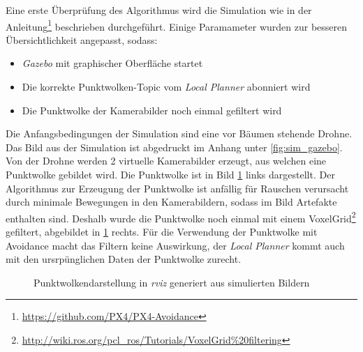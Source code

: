 Eine erste Überprüfung des Algorithmus wird die Simulation wie in der Anleitung\footnote{\url{https://github.com/PX4/PX4-Avoidance}\cite{dronecodestiftungObstacleDetectionAvoidance2023}} beschrieben durchgeführt. Einige Paramameter wurden zur besseren Übersichtlichkeit angepasst, sodass:
\begin{itemize}
    \item \textit{Gazebo} mit graphischer Oberfläche startet
    \item Die korrekte Punktwolken-Topic vom \textit{Local Planner} abonniert wird
    \item Die Punktwolke der Kamerabilder noch einmal gefiltert wird
\end{itemize} 

Die Anfangsbedingungen der Simulation sind eine vor Bäumen stehende Drohne. Das Bild aus der Simulation ist abgedruckt im Anhang unter \ref{fig:sim_gazebo}. Von der Drohne werden 2 virtuelle Kamerabilder erzeugt, aus welchen eine Punktwolke gebildet wird. Die Punktwolke ist in Bild \ref{fig:sim_gazebo_stereo} links dargestellt. Der Algorithmus zur Erzeugung der Punktwolke ist anfällig für Rauschen verursacht durch minimale Bewegungen in den Kamerabildern, sodass im Bild Artefakte enthalten sind. Deshalb wurde die Punktwolke noch einmal mit einem VoxelGrid\footnote{\url{http://wiki.ros.org/pcl_ros/Tutorials/VoxelGrid\%20filtering}\cite{openroboticsDocumentationROSWiki}} gefiltert, abgebildet in \ref{fig:sim_gazebo_stereo} rechts. Für die Verwendung der Punktwolke mit Avoidance macht das Filtern keine Auswirkung, der \textit{Local Planner} kommt auch mit den ursrpünglichen Daten der Punktwolke zurecht.

\begin{figure}[!ht]
    \centering
    \hfill
    \hfill
    \caption[Punktwolkendarstellung in \textit{rviz}]{Punktwolkendarstellung in \textit{rviz} generiert aus simulierten Bildern}
    \label{fig:sim_gazebo_stereo}
\end{figure}

